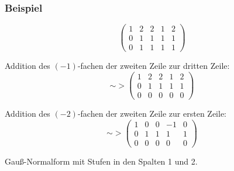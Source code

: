 %
%
\begin{frame}\frametitle{Beispiel}
	
	\vspace{-3mm}
	$$
		\left(
		\begin{array}{cccc|c}
			1 & 2 & 2 & 1 & 2\\
			0 & 1 & 1 & 1 & 1\\
			0 & 1 & 1 & 1 & 1
		\end{array}
		\right)
	$$
	
	\pause
	\vspace{5mm}
	Addition des $(-1)$-fachen der zweiten Zeile zur dritten Zeile:
	$$
		\sim>
		\left(
		\begin{array}{cccc|c}
			1 & 2 & 2 & 1 & 2\\
			0 & 1 & 1 & 1 & 1\\
			0 & 0 & 0 & 0 & 0
		\end{array}
		\right)
	$$

	\pause
	\vspace{5mm}
	Addition des $(-2)$-fachen der zweiten Zeile zur ersten Zeile:
	$$
		\sim>
		\left(
		\begin{array}{cccc|c}
			1 & 0 & 0 & -1 & 0\\
			0 & 1 & 1 & 1 & 1\\
			0 & 0 & 0 & 0 & 0
		\end{array}
		\right)
	$$
	
	\vspace{5mm}
	Gau{\ss}-Normalform mit Stufen in den Spalten 1 und 2.
	
\end{frame}
%
%
